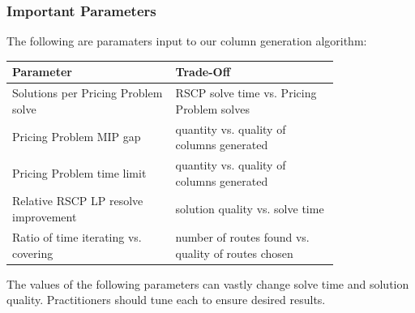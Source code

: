 \documentclass{beamer}
\begin{document}
	\begin{frame}[t]
		\frametitle{Important Parameters}
		\small
		\vspace{-.25cm}
		The following are paramaters input to our column generation algorithm:
		\vspace{.25cm}
		\begin{table}[ht]
			\centering
			\begin{tabular}{|p{0.4\linewidth}|p{0.4\linewidth}|}
				\hline
				\textbf{Parameter} & \textbf{Trade-Off} \\ 
				\hline
				Solutions per Pricing Problem solve & RSCP solve time vs. Pricing Problem solves \\ 
				\hline
				Pricing Problem MIP gap & quantity vs. quality of columns generated \\ 
				\hline
				Pricing Problem time limit & quantity vs. quality of columns generated \\ 
				\hline
				Relative RSCP LP resolve improvement & solution quality vs. solve time \\ 
				\hline
				Ratio of time iterating vs. covering & number of routes found vs. quality of routes chosen \\ 
				\hline
			\end{tabular}
		\end{table}
		\vspace{.25cm}
		\begin{block}{}
			The values of the following parameters can vastly change solve time and solution quality. Practitioners should tune each to ensure desired results.
		\end{block}
		\normalsize
	\end{frame}
\end{document}
